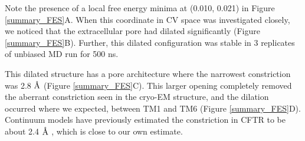 Note the presence of a local free energy minima at (0.010, 0.021) in Figure \ref{summary_FES}A. When this coordinate in CV space was investigated closely, we noticed that the extracellular pore had dilated significantly (Figure \ref{summary_FES}B). Further, this dilated configuration was stable in 3 replicates of unbiased MD run for 500 ns. 

This dilated structure has a pore architecture where the narrowest constriction was 2.8 $\textup{\AA}$ (Figure \ref{summary_FES}C). This larger opening completely removed the aberrant constriction seen in the cryo-EM structure, and the dilation occurred where we expected, between TM1 and TM6 (Figure \ref{summary_FES}D). Continuum models have previously estimated the constriction in CFTR to be about 2.4 $\textup{\AA}$ \cite{jun2016}, which is close to our own estimate. 

